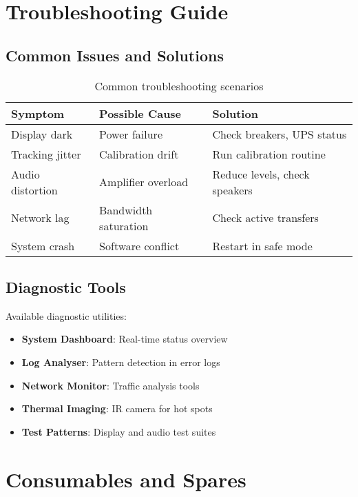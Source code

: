 \section{Troubleshooting Guide}

\subsection{Common Issues and Solutions}

\begin{table}[H]
\centering
\begin{tabularx}{\textwidth}{@{}lXX@{}}
\toprule
\textbf{Symptom} & \textbf{Possible Cause} & \textbf{Solution} \\
\midrule
Display dark & Power failure & Check breakers, UPS status \\
Tracking jitter & Calibration drift & Run calibration routine \\
Audio distortion & Amplifier overload & Reduce levels, check speakers \\
Network lag & Bandwidth saturation & Check active transfers \\
System crash & Software conflict & Restart in safe mode \\
\bottomrule
\end{tabularx}
\caption{Common troubleshooting scenarios}
\end{table}

\subsection{Diagnostic Tools}

Available diagnostic utilities:

\begin{itemize}
    \item \textbf{System Dashboard}: Real-time status overview
    \item \textbf{Log Analyser}: Pattern detection in error logs
    \item \textbf{Network Monitor}: Traffic analysis tools
    \item \textbf{Thermal Imaging}: IR camera for hot spots
    \item \textbf{Test Patterns}: Display and audio test suites
\end{itemize}

\section{Consumables and Spares}

